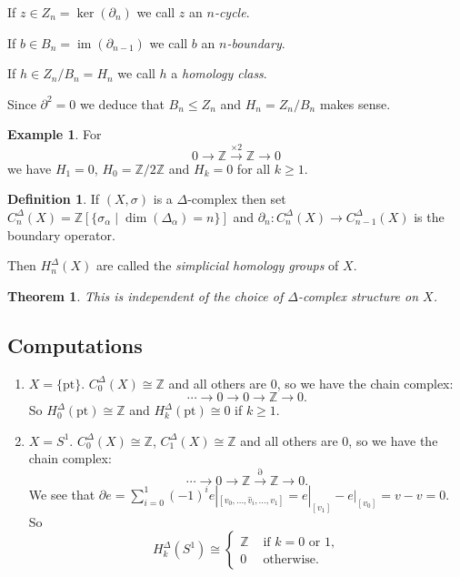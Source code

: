 \documentclass{article}
\newtheorem*{thm}{Theorem}
\theoremstyle{definition}
\newtheorem*{defn}{Definition}
\newtheorem*{ex}{Example}
\newcommand{\ZZ}{\mathbb{Z}}
\DeclareMathOperator{\im}{im}
\begin{document}
If $z\in Z_n = \ker(\partial_n)$ we call $z$ an \emph{$n$-cycle}.

If $b\in B_n = \im(\partial_{n-1})$ we call $b$ an \emph{$n$-boundary}.

If $h\in Z_n/B_n = H_n$ we call $h$ a \emph{homology class}.


Since $\partial^2 = 0$ we deduce that $B_n \le Z_n$ and $H_n = Z_n/B_n$ makes sense.

\begin{ex}
For
\[0\to\ZZ\xrightarrow{\times 2} \ZZ \to 0\]
we have $H_1 = 0$, $H_0 = \ZZ/2\ZZ$ and $H_k = 0$ for all $k \ge 1$.
\end{ex}

\begin{defn}
If $(X,\sigma)$ is a $\Delta$-complex then set $C_n^\Delta(X) = \ZZ[\{\sigma_\alpha \mid \dim(\Delta_\alpha) = n\}]$ and $\partial_n\colon C_n^\Delta(X) \to C_{n-1}^\Delta(X)$ is the boundary operator.

Then $H_n^\Delta(X)$ are called the \emph{simplicial homology groups} of $X$.
\end{defn}

\begin{thm}
This is independent of the choice of $\Delta$-complex structure on $X$.
\end{thm}

\subsection{Computations}
\begin{enumerate}
\item $X = \{\text{pt}\}$. $C_0^\Delta (X) \cong \ZZ$ and all others are 0, so we have the chain complex:
\[
\cdots \rightarrow 0 \rightarrow 0 \rightarrow \ZZ \rightarrow 0.
\]
So $H_0^\Delta(\text{pt}) \cong \ZZ$ and $H_k^\Delta(\text{pt}) \cong 0$ if $k\ge 1$.

\item $X = S^1$.
$C_0^\Delta (X) \cong \ZZ$, $C_1^\Delta (X) \cong \ZZ$ and all others are 0, so we have the chain complex:
\[
\cdots \rightarrow 0 \rightarrow \ZZ \xrightarrow{\partial} \ZZ \rightarrow 0.
\]
We see that $\partial e = \sum_{i=0}^{1} (-1)^i e|_{[v_0,\ldots,\hat{v}_i,\ldots,v_1]} = e|_{[v_1]} - e|_{[v_0]} = v-v = 0$.
So 
\[H_k^\Delta(S^1) \cong\begin{cases}
\ZZ &\text{ if } k = 0 \text{ or }1, \\
0 &\text{ otherwise}.
\end{cases} \]





\end{enumerate}
\end{document}
